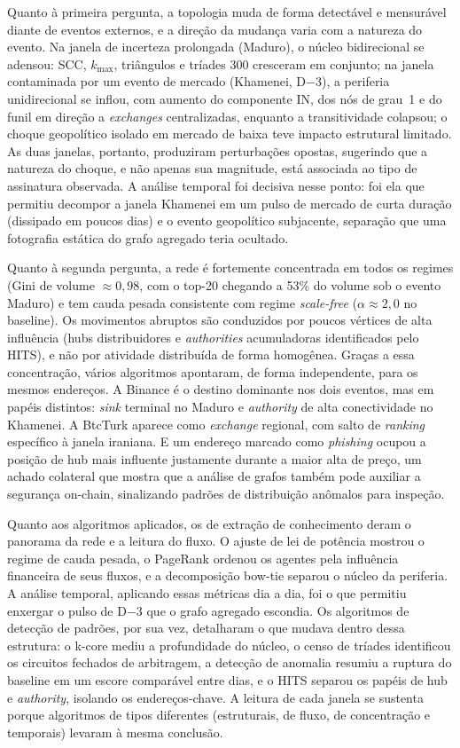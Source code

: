 \documentclass[12pt,a4paper]{article}
\begin{document}
Quanto à primeira pergunta, a topologia muda de forma detectável e mensurável diante de eventos externos, e a direção da mudança varia com a natureza do evento. Na janela de incerteza prolongada (Maduro), o núcleo bidirecional se adensou: SCC, $k_{\max}$, triângulos e tríades 300 cresceram em conjunto; na janela contaminada por um evento de mercado (Khamenei, D$-$3), a periferia unidirecional se inflou, com aumento do componente IN, dos nós de grau~1 e do funil em direção a \textit{exchanges} centralizadas, enquanto a transitividade colapsou; o choque geopolítico isolado em mercado de baixa teve impacto estrutural limitado. As duas janelas, portanto, produziram perturbações opostas, sugerindo que a natureza do choque, e não apenas sua magnitude, está associada ao tipo de assinatura observada. A análise temporal foi decisiva nesse ponto: foi ela que permitiu decompor a janela Khamenei em um pulso de mercado de curta duração (dissipado em poucos dias) e o evento geopolítico subjacente, separação que uma fotografia estática do grafo agregado teria ocultado.

Quanto à segunda pergunta, a rede é fortemente concentrada em todos os regimes (Gini de volume $\approx 0{,}98$, com o top-20 chegando a 53\% do volume sob o evento Maduro) e tem cauda pesada consistente com regime \textit{scale-free} ($\alpha \approx 2{,}0$ no baseline). Os movimentos abruptos são conduzidos por poucos vértices de alta influência (hubs distribuidores e \textit{authorities} acumuladoras identificados pelo HITS), e não por atividade distribuída de forma homogênea. Graças a essa concentração, vários algoritmos apontaram, de forma independente, para os mesmos endereços. A Binance é o destino dominante nos dois eventos, mas em papéis distintos: \textit{sink} terminal no Maduro e \textit{authority} de alta conectividade no Khamenei. A BtcTurk aparece como \textit{exchange} regional, com salto de \textit{ranking} específico à janela iraniana. E um endereço marcado como \textit{phishing} ocupou a posição de hub mais influente justamente durante a maior alta de preço, um achado colateral que mostra que a análise de grafos também pode auxiliar a segurança on-chain, sinalizando padrões de distribuição anômalos para inspeção.

Quanto aos algoritmos aplicados, os de extração de conhecimento deram o panorama da rede e a leitura do fluxo. O ajuste de lei de potência mostrou o regime de cauda pesada, o PageRank ordenou os agentes pela influência financeira de seus fluxos, e a decomposição bow-tie separou o núcleo da periferia. A análise temporal, aplicando essas métricas dia a dia, foi o que permitiu enxergar o pulso de D$-$3 que o grafo agregado escondia. Os algoritmos de detecção de padrões, por sua vez, detalharam o que mudava dentro dessa estrutura: o k-core mediu a profundidade do núcleo, o censo de tríades identificou os circuitos fechados de arbitragem, a detecção de anomalia resumiu a ruptura do baseline em um escore comparável entre dias, e o HITS separou os papéis de hub e \textit{authority}, isolando os endereços-chave. A leitura de cada janela se sustenta porque algoritmos de tipos diferentes (estruturais, de fluxo, de concentração e temporais) levaram à mesma conclusão.
\end{document}
